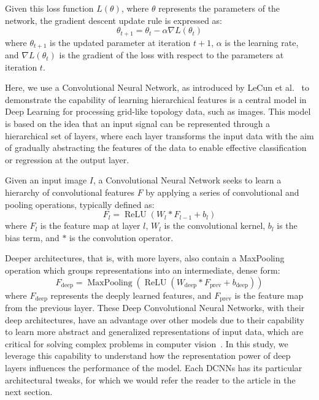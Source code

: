 Given this loss function \(L(\theta)\), where \(\theta\) represents the parameters of the network, the gradient descent update rule is expressed as:
\begin{equation}
\theta_{t+1} = \theta_t - \alpha \nabla L(\theta_t)
\end{equation}
where \(\theta_{t+1}\) is the updated parameter at iteration \(t+1\), \(\alpha\) is the learning rate, and \(\nabla L(\theta_t)\) is the gradient of the loss with respect to the parameters at iteration \(t\).

Here, we use a Convolutional Neural Network, as introduced by LeCun et al.~\cite{lecun1998gradient} to demonstrate the capability of learning hierarchical features is a central model in Deep Learning for processing grid-like topology data, such as images. This model is based on the idea that an input signal can be represented through a hierarchical set of layers, where each layer transforms the input data with the aim of gradually abstracting the features of the data to enable effective classification or regression at the output layer.

Given an input image \(I\), a Convolutional Neural Network seeks to learn a hierarchy of convolutional features \(F\) by applying a series of convolutional and pooling operations, typically defined as:
\begin{equation}
F_l = \operatorname{ReLU}(W_l \ast F_{l-1} + b_l)
\end{equation}
where \(F_l\) is the feature map at layer \(l\), \(W_l\) is the convolutional kernel, \(b_l\) is the bias term, and \(\ast\) is the convolution operator.

Deeper architectures, that is, with more layers, also contain a MaxPooling operation which groups representations into an intermediate, dense form: 
\begin{equation}
F_{\text{deep}} = \operatorname{MaxPooling}(\operatorname{ReLU}(W_{\text{deep}} \ast F_{\text{prev}} + b_{\text{deep}}))
\end{equation}
where \(F_{\text{deep}}\) represents the deeply learned features, and \(F_{\text{prev}}\) is the feature map from the previous layer. These Deep Convolutional Neural Networks, with their deep architectures, have an advantage over other models due to their capability to learn more abstract and generalized representations of input data, which are critical for solving complex problems in computer vision~\cite{krizhevsky2012imagenet}. In this study, we leverage this capability to understand how the representation power of deep layers influences the performance of the model. Each DCNNs has its particular architectural tweaks, for which we would refer the reader to the article in the next section.

